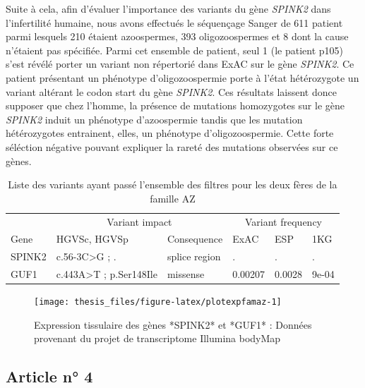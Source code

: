 \documentclass[12pt,twoside]{reedthesis}
\theoremstyle{definition}
\theoremstyle{definition}
\theoremstyle{remark}
\begin{document}
  Suite à cela, afin d'évaluer l'importance des variants du gène
  \emph{SPINK2} dans l'infertilité humaine, nous avons effectués le
  séquençage Sanger de 611 patient parmi lesquels 210 étaient azoospermes,
  393 oligozoospermes et 8 dont la cause n'étaient pas spécifiée. Parmi
  cet ensemble de patient, seul 1 (le patient p105) s'est révélé porter un
  variant non répertorié dans ExAC sur le gène \emph{SPINK2}. Ce patient
  présentant un phénotype d'oligozoospermie porte à l'état hétérozygote un
  variant altérant le codon start du gène \emph{SPINK2}. Ces résultats
  laissent donce supposer que chez l'homme, la présence de mutations
  homozygotes sur le gène \emph{SPINK2} induit un phénotype d'azoospermie
  tandis que les mutation hétérozygotes entrainent, elles, un phénotype
  d'oligozoospermie. Cette forte séléction négative pouvant expliquer la
  rareté des mutations observées sur ce gènes.
  
  \begin{longtable}[t]{llllll}
  \caption{\label{tab:tabrecapaz}Liste des variants ayant passé l'ensemble des filtres pour les deux fères de la famille AZ}\\
  \toprule
  \multicolumn{1}{c}{ } & \multicolumn{2}{c}{Variant impact} & \multicolumn{3}{c}{Variant frequency} \\
  \cmidrule(l{2pt}r{2pt}){2-3} \cmidrule(l{2pt}r{2pt}){4-6}
  Gene & HGVSc, HGVSp & Consequence & ExAC & ESP & 1KG\\
  \midrule
  SPINK2 & c.56-3C>G ; . & splice region & . & . & .\\
  GUF1 & c.443A>T ; p.Ser148Ile & missense & 0.00207 & 0.0028 & 9e-04\\
  \bottomrule
  \end{longtable}
  
  \newpage
  
  \begin{figure}
  
  {\centering \texttt{[image: thesis\_files/figure-latex/plotexpfamaz-1]} 
  
  }
  
  \caption[Expression tissulaire des gènes *SPINK2* et *GUF1*]{Expression tissulaire des gènes *SPINK2* et *GUF1* : Données provenant du projet de transcriptome Illumina bodyMap}\label{fig:plotexpfamaz}
  \end{figure}
  
  \newpage
  
  \subsection{Article n° 4}\label{article-n-4}
  
\end{document}

